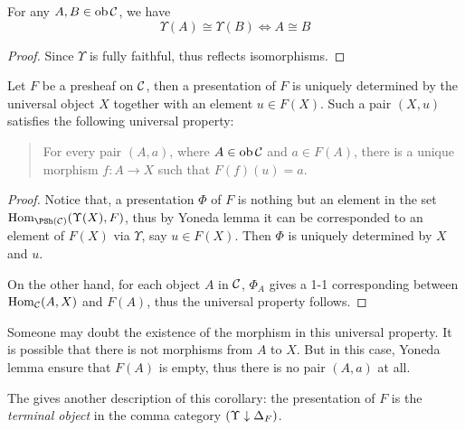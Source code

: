   \begin{cor}\label{coro:Yoneda2}
    For any $A,B\in\operatorname{ob}{\cal C}$, we have
    \begin{equation*}
      \Upsilon(A)\cong\Upsilon(B)\iff A\cong B
    \end{equation*}
  \end{cor}
  \begin{proof}
    Since $\Upsilon$ is fully faithful, thus reflects isomorphisms.
  \end{proof}

  \begin{cor}
    Let $F$ be a presheaf on ${\cal C}$, then a presentation of $F$ is uniquely determined by the universal object $X$ together with an element $u\in F(X)$. Such a pair $(X,u)$ satisfies the following universal property:
    \begin{quote}
      For every pair $(A,a)$, where $A\in\operatorname{ob}{\cal C}$ and $a\in F(A)$, there is a unique morphism $f\colon A\to X$ such that $F(f)(u)=a$.
    \end{quote}
  \end{cor}
  \begin{proof}
    Notice that, a presentation $\Phi$ of $F$ is nothing but an element in the set $\Hom_{\PSh(\Cc)}(\Upsilon(X),F)$, thus by Yoneda lemma it can be corresponded to an element of $F(X)$ via $\Upsilon$, say $u\in F(X)$. Then $\Phi$ is uniquely determined by $X$ and $u$.

    On the other hand, for each object $A$ in ${\cal C}$, $\Phi_{A}$ gives a 1-1 corresponding between $\operatorname{Hom}_{{\cal C}}(A,X)$ and $F(A)$, thus the universal property follows.
  \end{proof}
  \begin{rem}
    Someone may doubt the existence of the morphism in this universal property. It is possible that there is not morphisms from $A$ to $X$. But in this case, Yoneda lemma ensure that $F(A)$ is empty, thus there is no pair $(A,a)$ at all.
  \end{rem}
  \begin{rem}
    The \nlab gives another description of this corollary: the presentation of $F$ is the \emph{terminal object} in the comma category $(\Upsilon\downarrow\Delta_{F})$.
  \end{rem}

